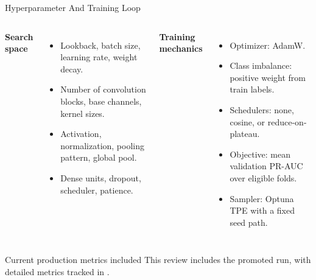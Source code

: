 \documentclass[aspectratio=169]{beamer}
\begin{document}
\begin{frame}[shrink=4]{Hyperparameter And Training Loop}
\begin{columns}[T,onlytextwidth]
\textbf{Search space}
\begin{itemize}
  \item Lookback, batch size, learning rate, weight decay.
  \item Number of convolution blocks, base channels, kernel sizes.
  \item Activation, normalization, pooling pattern, global pool.
  \item Dense units, dropout, scheduler, patience.
\end{itemize}

\textbf{Training mechanics}
\begin{itemize}
  \item Optimizer: AdamW.
  \item Class imbalance: positive weight from train labels.
  \item Schedulers: none, cosine, or reduce-on-plateau.
  \item Objective: mean validation PR-AUC over eligible folds.
  \item Sampler: Optuna TPE with a fixed seed path.
\end{itemize}
\end{columns}
\tightsep
\begin{block}{Current production metrics included}
\small This review includes the promoted  run, with detailed metrics tracked in .
\end{block}
\end{frame}
\end{document}
